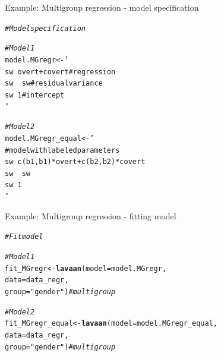 \documentclass[10pt]{beamer}\usepackage[]{graphicx}\usepackage[]{xcolor}
\makeatletter
\newcommand{\hlstr}[1]{\textcolor[rgb]{0.192,0.494,0.8}{#1}}%
\newcommand{\hlcom}[1]{\textcolor[rgb]{0.678,0.584,0.686}{\textit{#1}}}%
\newcommand{\hlstd}[1]{\textcolor[rgb]{0.345,0.345,0.345}{#1}}%
\newcommand{\hlkwb}[1]{\textcolor[rgb]{0.69,0.353,0.396}{#1}}%
\newcommand{\hlkwc}[1]{\textcolor[rgb]{0.333,0.667,0.333}{#1}}%
\newcommand{\hlkwd}[1]{\textcolor[rgb]{0.737,0.353,0.396}{\textbf{#1}}}%
\newenvironment{kframe}{%
 \def\at@end@of@kframe{}%
 \ifinner\ifhmode%
  \def\at@end@of@kframe{\end{minipage}}%
  \begin{minipage}{\columnwidth}%
 \fi\fi%
 \def\FrameCommand##1{\hskip\@totalleftmargin \hskip-\fboxsep
 \colorbox{shadecolor}{##1}\hskip-\fboxsep
     \hskip-\linewidth \hskip-\@totalleftmargin \hskip\columnwidth}%
 \MakeFramed {\advance\hsize-\width
   \@totalleftmargin\z@ \linewidth\hsize
   \@setminipage}}%
 {\par\unskip\endMakeFramed%
 \at@end@of@kframe}
\newenvironment{knitrout}{}{} %
\makeatother
\begin{document}
\begin{frame}[fragile]{Example: Multigroup regression - model specification}

\begin{knitrout}
\color{fgcolor}\begin{kframe}
\begin{alltt}
\hlcom{# Model specification}

\hlcom{# Model 1}
\hlstd{model.MGregr} \hlkwb{<-} \hlstr{'
  sw ~ overt + covert # regression
  sw ~~ sw            # residual variance
  sw ~ 1              # intercept
'}

\hlcom{# Model 2}
\hlstd{model.MGregr_equal} \hlkwb{<-} \hlstr{'
  # model with labeled parameters
  sw ~ c(b1,b1)*overt + c(b2,b2)*covert 
  sw ~~ sw                                      
  sw ~ 1                                        
'}
\end{alltt}
\end{kframe}
\end{knitrout}
          
\end{frame}
%
\begin{frame}[fragile]{Example: Multigroup regression - fitting model}

\begin{knitrout}
\color{fgcolor}\begin{kframe}
\begin{alltt}
\hlcom{# Fit model}

\hlcom{# Model 1}
\hlstd{fit_MGregr} \hlkwb{<-} \hlkwd{lavaan}\hlstd{(}\hlkwc{model} \hlstd{= model.MGregr,}
                    \hlkwc{data} \hlstd{= data_regr,}
                    \hlkwc{group} \hlstd{=} \hlstr{"gender"}\hlstd{)} \hlcom{# multigroup}

\hlcom{# Model 2}
\hlstd{fit_MGregr_equal} \hlkwb{<-} \hlkwd{lavaan}\hlstd{(}\hlkwc{model} \hlstd{= model.MGregr_equal,}
                    \hlkwc{data} \hlstd{= data_regr,}
                    \hlkwc{group} \hlstd{=} \hlstr{"gender"}\hlstd{)} \hlcom{# multigroup}
\end{alltt}
\end{kframe}
\end{knitrout}
          
\end{frame}
\end{document}

